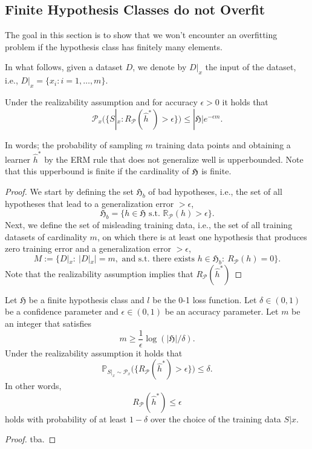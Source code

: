 \subsection{Finite Hypothesis Classes do not Overfit}
The goal in this section is to show that we won't encounter an overfitting
problem if the hypothesis class has finitely many elements. 

In what follows, given a dataset $D$, we denote by $D|_x$ the input of the
dataset, i.e., $D|_x=\{x_i: i=1,\dots,m\}$.

\begin{lemma}
		Under the realizability assumption and
		for accuracy $\epsilon >0$ it holds that 
		$$
		\mathcal{P}_x\bigl(\{S|_x: R_\mathcal{P}(\hat{h}^*) > \epsilon\} \bigr) \leq |\mathfrak{H}| e ^{-\epsilon m}.
		$$
	\end{lemma}
	In words; the probability of sampling $m$ training data points and
	obtaining a learner $\hat{h}^*$ by the ERM rule that does not generalize well is
	upperbounded. Note that this upperbound is finite if the cardinality of
	$\frak{H}$ is finite.
\begin{proof}
    We start by defining the set $\mathfrak{H}_b$ of bad hypotheses, i.e., the
    set of all hypotheses that lead to a generalization error $> \epsilon$,
    $$
    \mathfrak{H}_b = \{h \in \mathfrak{H} \text{ s.t. } \mathbb{R}_\mathcal{P} (h) > \epsilon\}.
    $$
    Next, we define the set of misleading training data, i.e., the set of all
    training datasets of cardinality $m$, on which there is at least one
    hypothesis that produces zero training error and a generalization error $>
    \epsilon$,
    $$
    M:= \{D|_x: \ |D|_x|=m, \text{ and s.t. there exists }h  \in \mathfrak{H}_b : \ R_\mathcal{P}(h)=0 \}.
    $$
    Note that the realizability assumption implies that $R_\mathcal{P}(\hat{h}^*)$
\end{proof}
    \begin{coro}
		\label{Coro:finite_hypo}
		Let $\mathfrak{H}$ be a finite hypothesis class and $l$ be the 0-1 loss
		function. Let $\delta \in (0,1)$ be a confidence parameter and $\epsilon \in
		(0,1)$ be an accuracy parameter. Let $m$ be an integer that satisfies
		$$
		m \geq \frac{1}{\epsilon} \log(|\mathfrak{H}|/\delta).
		$$ 	
		Under the realizability assumption it holds that 
		$$
		\mathbb{P}_{S|_x \sim \mathcal{P}_x} \bigl( \{ R_\mathcal{P}(\hat{h}^*) > \epsilon \}\bigr) \leq \delta.
		$$
		In other words, 
		$$
		R_\mathcal{P}(\hat{h}^*) \leq \epsilon
		$$
		holds with probability of at least $1-\delta$ over the choice of the
		training data $S|x$.
	\end{coro}
    \begin{proof}
        tba.
    \end{proof}
